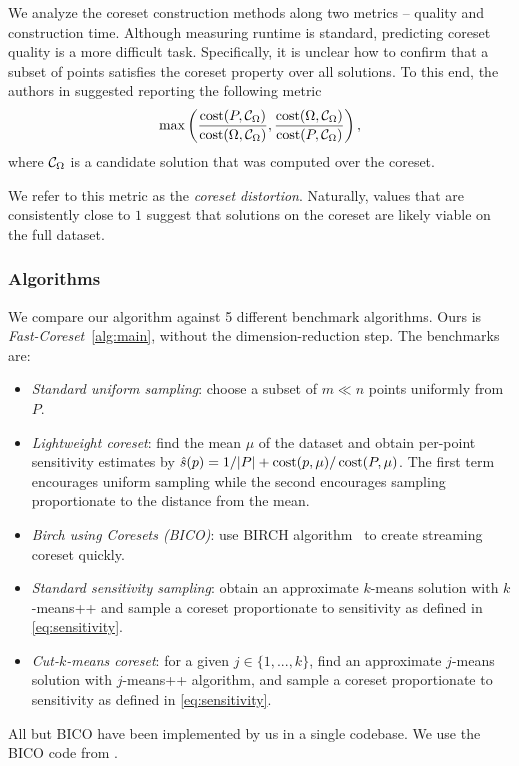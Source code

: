 We analyze the coreset construction methods along two metrics -- quality and construction time.  Although measuring runtime is standard, predicting coreset
quality is a more difficult task. Specifically, it is unclear how to confirm that a subset of points satisfies the coreset property over all solutions. To this
end, the authors in \cite{chrisESA} suggested reporting the following metric 
\[ \max \left( \dfrac{\operatorname{cost}(P, \mathcal C_{\Omega})}{\operatorname{cost}(\Omega, \mathcal C_{\Omega})}, \dfrac{\operatorname{cost}(\Omega, \mathcal C_{\Omega})}{\operatorname{cost}(P, \mathcal C_{\Omega})} \right),\]
where $\mathcal C_{\Omega}$ is a candidate solution that was computed over the coreset.

We refer to this metric as the \emph{coreset distortion}. Naturally, values that are consistently close to $1$ suggest that solutions on the coreset are likely
viable on the full dataset.


\subsubsection{Algorithms}
\label{ssec:algorithms}


We compare our algorithm against 5 different benchmark algorithms. Ours is \emph{Fast-Coreset}~\ref{alg:main}, without the dimension-reduction step. The benchmarks are:
\begin{itemize}
        \item \emph{Standard uniform sampling}: choose a subset of $m \ll n$ points uniformly from $P$.
        \item \emph{Lightweight coreset}: find the mean $\mu$ of the dataset and obtain per-point sensitivity estimates by $\hat{s}(p) = 1/|P| + \operatorname{cost}(p, \mu) / \operatorname{cost}(P, \mu)$.
            The first term encourages uniform sampling while the second encourages sampling proportionate to the distance from the mean.
        \item \emph{Birch using Coresets (BICO)}: use BIRCH algorithm~\cite{birch} to create streaming coreset quickly. 
        \item \emph{Standard sensitivity sampling}: obtain an approximate $k$-means solution with $k$-means++ and sample a coreset proportionate to sensitivity as defined in \cref{eq:sensitivity}.
        \item \emph{Cut-$k$-means coreset}: for a given $j \in \{1,..., k\}$, find an approximate $j$-means solution with $j$-means++ algorithm, and sample
            a coreset proportionate to sensitivity as defined in \cref{eq:sensitivity}.\end{itemize}
All but BICO have been implemented by us in a single codebase. We use the BICO code from \cite{bico}.

